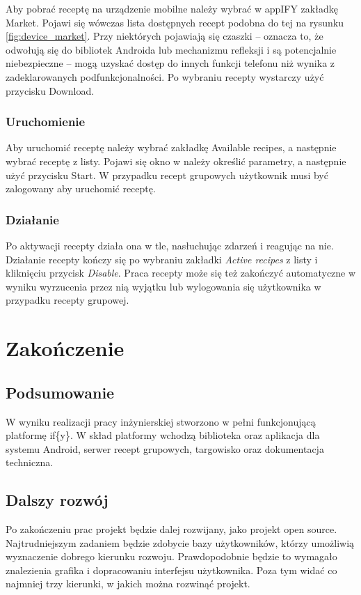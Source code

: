 \documentclass[11pt,a4paper,polish,thesis]{dcsbook}
\begin{document}
Aby pobrać receptę na urządzenie mobilne należy wybrać w appIFY zakładkę Market. Pojawi się wówczas lista dostępnych recept podobna do tej na rysunku
\ref{fig:device_market}. Przy niektórych pojawiają się czaszki -- oznacza to, że odwołują się do bibliotek Androida lub mechanizmu refleksji i są potencjalnie
niebezpieczne -- mogą uzyskać dostęp do innych funkcji telefonu niż wynika z zadeklarowanych podfunkcjonalności. Po wybraniu recepty wystarczy użyć przycisku Download.
\subsection{Uruchomienie}
Aby uruchomić receptę należy wybrać zakładkę Available recipes, a następnie wybrać receptę z listy. Pojawi się okno w należy określić parametry, a następnie użyć przycisku Start. W przypadku recept grupowych użytkownik musi być zalogowany aby uruchomić receptę.
\subsection{Działanie}
Po aktywacji recepty działa ona w tle, nasłuchując zdarzeń i reagując na nie. Działanie recepty kończy się po wybraniu zakładki \emph{Active recipes} z listy i
kliknięciu przycisk \emph{Disable}. Praca recepty może się też zakończyć automatyczne w wyniku wyrzucenia przez nią wyjątku lub wylogowania się użytkownika w
przypadku recepty grupowej.

\chapter{Zakończenie}
\section{Podsumowanie}
W wyniku realizacji pracy inżynierskiej stworzono w pełni funkcjonującą platformę if\{y\}. W skład platformy wchodzą biblioteka oraz aplikacja dla systemu Android,
serwer recept grupowych, targowisko oraz dokumentacja techniczna. %
\section{Dalszy rozwój}
Po zakończeniu prac projekt będzie dalej rozwijany, jako projekt open source. Najtrudniejszym zadaniem będzie zdobycie bazy użytkowników, którzy umożliwią wyznaczenie dobrego kierunku rozwoju. Prawdopodobnie będzie to wymagało znalezienia grafika i dopracowaniu interfejsu użytkownika. Poza tym widać co najmniej trzy kierunki, w jakich można rozwinąć projekt.
\end{document}

